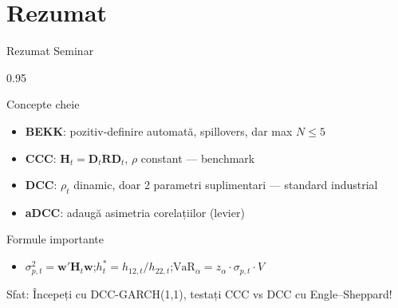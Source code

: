 \documentclass[9pt, aspectratio=169, t]{beamer}
\begin{document}
\section{Rezumat}

\begin{frame}{Rezumat Seminar}
    \begin{cminipage}{0.95\textwidth}
    {\footnotesize
    \vspace{-2mm}
    \begin{block}{Concepte cheie}
        \begin{itemize}\setlength{\itemsep}{-1pt}
            \item \textbf{BEKK}: pozitiv-definire automată, spillovers, dar max $N \leq 5$
            \item \textbf{CCC}: $\mathbf{H}_t = \mathbf{D}_t\mathbf{R}\mathbf{D}_t$, $\rho$ constant --- benchmark
            \item \textbf{DCC}: $\rho_t$ dinamic, doar 2 parametri suplimentari --- standard industrial
            \item \textbf{aDCC}: adaugă asimetria corelațiilor (levier)
        \end{itemize}
    \end{block}
    \vspace{-1mm}
    \begin{block}{Formule importante}
        \begin{itemize}\setlength{\itemsep}{-1pt}
            \item $\sigma_{p,t}^2 = \mathbf{w}'\mathbf{H}_t\mathbf{w}$;\quad $h_t^* = h_{12,t}/h_{22,t}$;\quad $\text{VaR}_\alpha = z_\alpha \cdot \sigma_{p,t} \cdot V$
        \end{itemize}
    \end{block}
    \vspace{-1mm}
    \begin{alertblock}{Sfat: Începeți cu DCC-GARCH(1,1), testați CCC vs DCC cu Engle--Sheppard!}
    \end{alertblock}
    }
    \end{cminipage}
\end{frame}
\end{document}
